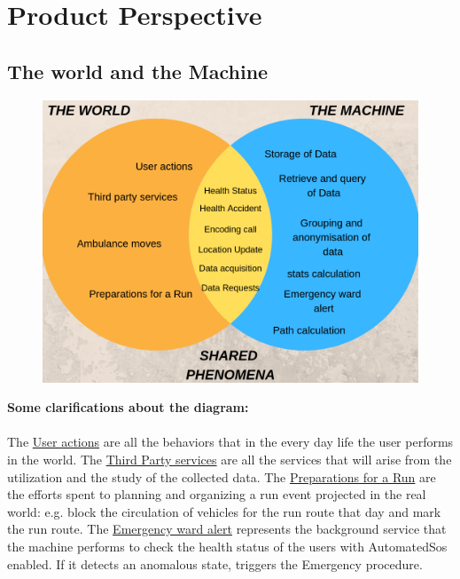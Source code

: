 \section{Product Perspective}
\subsection{The world and the Machine}
\begin{figure}[H]
    \centering
    \includegraphics[scale=0.4]{rasdL/Pictures/world.png}
  
\end{figure}

\textbf{Some clarifications about the diagram:}\\ \\
The \underline{User actions} are all the behaviors that in the every day life the user performs in the world. The \underline{Third Party services} are all the services that will arise from the utilization and the study of the collected data. The \underline{Preparations for a Run} are the efforts spent to planning and organizing a run event projected in the real world: e.g. block the circulation of vehicles for the run route that day and mark the run route. The \underline{Emergency ward alert} represents the background service that the machine performs to check the health status 
of the users with AutomatedSos enabled. If it detects an anomalous state, triggers the Emergency procedure.

\newpage
